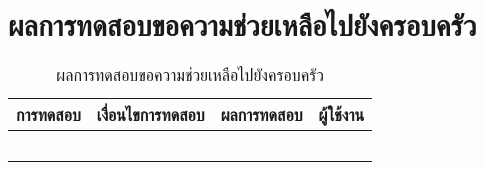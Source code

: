 \section{ผลการทดสอบขอความช่วยเหลือไปยังครอบครัว}
\begin{table}[H]
	\caption{ผลการทดสอบขอความช่วยเหลือไปยังครอบครัว}
    \centering	
	\label{tab:test23}
    \begin{tabular}{ | p{4cm} | p{4cm} | p{4cm} | p{2cm} | }
		\hline
	\multicolumn{1}{|c|}{การทดสอบ} & \multicolumn{1}{c|}{เงื่อนไขการทดสอบ} & \multicolumn{1}{c|}{ผลการทดสอบ} & \multicolumn{1}{c|}{ผู้ใช้งาน}                             \\ \hline
	\setstretch{1.0}{ทดสอบขอความช่วยเหลือไปยังครอบครัว}
	& \setstretch{1.0}{ผู้ใช้ขอความช่วยเหลือไปยังครอบครัว}
	& \setstretch{1.0}{ระบบแสดงหน้าขอความช่วยเหลือครอบครัว} 
	&\setstretch{1.0}{\begin{flushleft}ผู้ใช้งาน\end{flushleft}} \\ \cline{2-3} 
	& \setstretch{1.0}{ผู้ใช้เลือกปุ่มโทรหาสมาชิกในครอบครัว และสมาชิกมีข้อมูลเบอร์โทรศัพท์}
	& \setstretch{1.0}{ระบบจะเรียกใช้งานการโทรของมือถือผู้ใช้พร้อมกับเบอร์ของสมาชิก } 
	&\setstretch{1.0}{}\\ \cline{2-3} 
	& \setstretch{1.0}{ผู้ใช้เลือกปุ่มโทรหาสมาชิกในครอบครัว และสมาชิกไม่มีข้อมูลเบอร์โทรศัพท์}
	& \setstretch{1.0}{ระบบแสดงข้อความ “สมาชิกไม่ได้ระบุเบอร์โทรศัพท์” } 
	&\setstretch{1.0}{}\\ \cline{2-3} 
	& \setstretch{1.0}{ผู้ใช้เลือกปุ่มส่งข้อความหาสมาชิกในครอบครัว และสมาชิกมีข้อมูลเบอร์โทรศัพท์}
	& \setstretch{1.0}{ระบบจะเรียกใช้งานการส่งข้อความของมือถือผู้ใช้พร้อมกับเบอร์ของสมาชิก และข้อความขอความช่วยเหลือ } 
	&\setstretch{1.0}{}\\ \cline{2-3} 
	& \setstretch{1.0}{ผู้ใช้เลือกปุ่มส่งข้อความหาสมาชิกในครอบครัว และสมาชิกไม่มีข้อมูลเบอร์โทรศัพท์}
	& \setstretch{1.0}{ระบบแสดงข้อความ “สมาชิกไม่ได้ระบุเบอร์โทรศัพท์” } 
	&\setstretch{1.0}{}\\ \cline{2-3} 
    \end{tabular}
\end{table}

